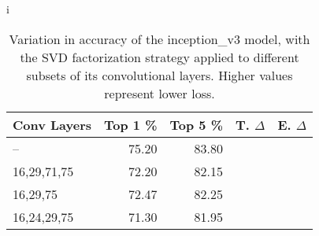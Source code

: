 i\begin{table}
\centering
\begin{tabular}{|l|r|r|r|r|}
\hline
Conv Layers & Top 1 \% & Top 5 \% & T. $\Delta$ & E. $\Delta$ \\\hline 
-- & 75.20 & 83.80  &  & \\\hline
16,29,71,75 & 72.20 & 82.15 &  &  \\\hline
16,29,75 & 72.47 & 82.25 &  &  \\\hline
16,24,29,75 & 71.30 & 81.95 &  &  \\\hline
\end{tabular}
\caption{Variation in accuracy of the inception\_v3 model, with the SVD factorization strategy applied to different subsets of its convolutional layers. Higher values represent lower loss.}
\label{inception_v3-accuracy}
\end{table}
